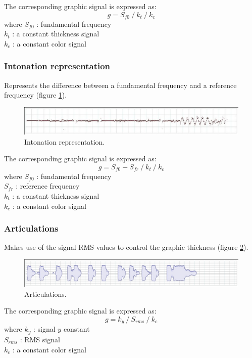 \documentclass{article}
\newcommand{\rshift}			{\hspace*{9mm}}
\begin{document}
The corresponding graphic signal is expressed as:
\[ g = S_{f0}\ /\ k_t\ /\ k_c \]
where $S_{f0}$ : fundamental frequency \\
\rshift	 $k_t$ : a constant thickness signal \\
\rshift	 $k_c$ : a constant color signal 
 
\subsubsection{Intonation representation}
Represents the difference between a fundamental frequency and a reference frequency
(figure \ref{fig:finepitch}).
\begin{figure}[h]
\centerline{
	\includegraphics[width=0.99\columnwidth]{imgs/curves/finepitch}}
\caption{Intonation representation.}
\label{fig:finepitch}
\end{figure}

The corresponding graphic signal is expressed as:
\[ g = S_{f0}-S_{fr}\ /\ k_t\ /\ k_c \]
where $S_{f0}$ : fundamental frequency \\
\rshift	 $S_{fr}$ : reference frequency \\
\rshift	 $k_t$ : a constant thickness signal \\
\rshift	 $k_c$ : a constant color signal 
 
\subsubsection{Articulations}
Makes use of the signal RMS values to control the graphic thickness
(figure \ref{fig:articulation}).
\begin{figure}[htbp]
\centerline{
	\includegraphics[width=0.99\columnwidth]{imgs/curves/articulation}}
\caption{Articulations.}
\label{fig:articulation}
\end{figure}

The corresponding graphic signal is expressed as:
\[ g = k_y\ /\ S_{rms}\ /\ k_c \]
where $k_y$ : signal $y$ constant \\
\rshift	 $S_{rms}$ : RMS signal \\
\rshift	 $k_c$ : a constant color signal 
 
\end{document}
